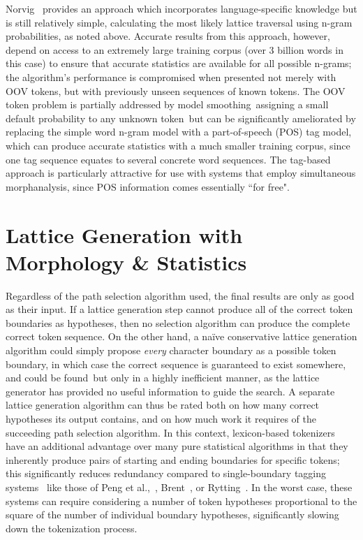 Norvig~\cite{norvig14} provides an approach which incorporates language-specific knowledge but is still relatively simple, calculating the most likely lattice traversal using n-gram probabilities, as noted above. Accurate results from this approach, however, depend on access to an extremely large training corpus (over 3 billion words in this case) to ensure that accurate statistics are available for all possible n-grams; the algorithm's performance is compromised when presented not merely with OOV tokens, but with previously unseen sequences of known tokens. The OOV token problem is partially addressed by model smoothing\textemdash~assigning a small default probability to any unknown token\textemdash~but can be significantly ameliorated by replacing the simple word n-gram model with a part-of-speech (POS) tag model, which can produce accurate statistics with a much smaller training corpus, since one tag sequence equates to several concrete word sequences. The tag-based approach is particularly attractive for use with systems that employ simultaneous morphanalysis, since POS information comes essentially ``for free".

\section{Lattice Generation with Morphology \& Statistics}

Regardless of the path selection algorithm used, the final results are only as good as their input. If a lattice generation step cannot produce all of the correct token boundaries as hypotheses, then no selection algorithm can produce the complete correct token sequence. On the other hand, a naïve conservative lattice generation algorithm could simply propose \textit{every} character boundary as a possible token boundary, in which case the correct sequence is guaranteed to exist somewhere, and could be found\textemdash~but only in a highly inefficient manner, as the lattice generator has provided no useful information to guide the search. A separate lattice generation algorithm can thus be rated both on how many correct hypotheses its output contains, and on how much work it requires of the succeeding path selection algorithm. In this context, lexicon-based tokenizers have an additional advantage over many pure statistical algorithms in that they inherently produce pairs of starting and ending boundaries for specific tokens; this significantly reduces redundancy compared to single-boundary tagging systems~\cite{kudo04} like those of Peng et al.,~\cite{peng04}, Brent~\cite{brent99}, or Rytting~\cite{rytting04}. In the worst case, these systems can require considering a number of token hypotheses proportional to the square of the number of individual boundary hypotheses, significantly slowing down the tokenization process.

